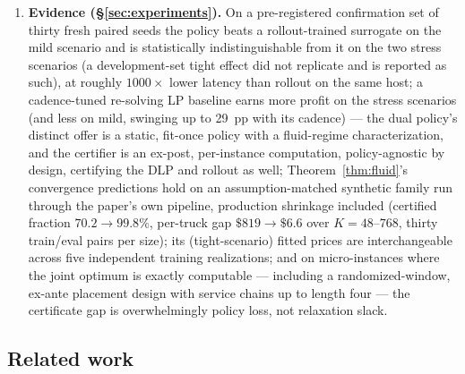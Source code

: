 \documentclass[11pt]{article}
\begin{document}
\begin{enumerate}
  particular random instance sampler (${\sim}0.03\%$ of draws);
  whether they matter at benchmark scale is an attribution question we
  treat empirically.
\item \textbf{Evidence (\S\ref{sec:experiments}).} On a
  pre-registered confirmation set of thirty fresh paired seeds the
  policy beats a rollout-trained surrogate on the mild scenario and
  is statistically indistinguishable from it on the two stress
  scenarios (a development-set tight effect did not replicate and is
  reported as such), at roughly $1000\times$ lower latency than
  rollout on the same host; a cadence-tuned re-solving LP baseline earns more
  profit on the stress scenarios (and less on mild, swinging up to
  29~pp with its cadence) --- the dual policy's distinct
  offer is a static, fit-once policy with a fluid-regime
  characterization, and the certifier is an ex-post, per-instance
  computation, policy-agnostic by design, certifying the DLP and
  rollout as well; Theorem~\ref{thm:fluid}'s convergence
  predictions hold on an assumption-matched synthetic family run
  through the paper's own pipeline, production shrinkage included
  (certified fraction $70.2 \to 99.8\%$, per-truck gap
  $\$819 \to \$6.6$ over $K = 48$--$768$, thirty train/eval pairs
  per size); its (tight-scenario)
  fitted prices are interchangeable across five independent training
  realizations; and on micro-instances where the joint optimum is
  exactly computable --- including a randomized-window, ex-ante
  placement design with service chains up to length four --- the
  certificate gap is overwhelmingly policy loss, not relaxation
  slack.
\end{enumerate}

\subsection{Related work}
\label{sec:related}
\end{document}
